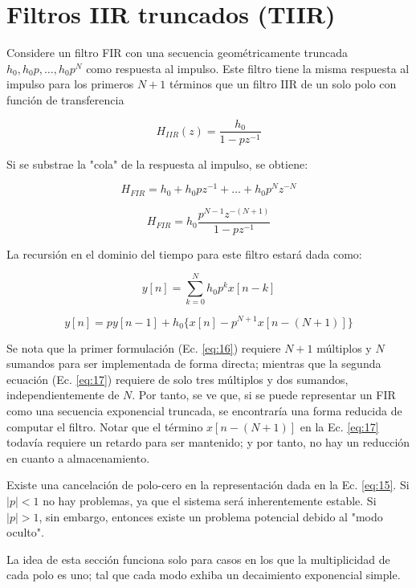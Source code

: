 \section{Filtros IIR truncados (TIIR)}
    Considere un filtro FIR con una secuencia geométricamente truncada $h_0,h_0p,\ldots , h_0 p^N$ como respuesta al impulso. Este filtro tiene la misma respuesta al impulso para los primeros $N+1$ términos que un filtro IIR de un solo polo con función de transferencia

    \begin{equation}
      H_{IIR}(z) = \frac{h_0}{1- p z^{-1}}
    \end{equation}

    Si se substrae la "cola" de la respuesta al impulso, se obtiene:

    \begin{equation}
      H_{FIR} = h_0 + h_0 p z^{-1} + \ldots + h_0 p^N z^{-N}
    \end{equation}

    \begin{equation}
      H_{FIR} = h_0 \frac{p^{N-1} z^{-(N+1)}}{1 - p z^{-1}}
      \label{eq:15}
    \end{equation}

    La recursión en el dominio del tiempo para este filtro estará dada como:

    \begin{equation}
      y[n] = \sum_{k=0}^{N}{h_0 p^k x[n-k]}
      \label{eq:16}
    \end{equation}

    \begin{equation}
      y[n] = p y[n-1] + h_0 \{x[n] - p^{N+1} x[n - (N+1)]\}
      \label{eq:17}
    \end{equation}

    Se nota que la primer formulación (Ec. \ref{eq:16}) requiere $N+1$ múltiplos y $N$ sumandos para ser implementada de forma directa; mientras que la segunda ecuación (Ec. \ref{eq:17}) requiere de solo tres múltiplos y dos sumandos, independientemente de $N$. Por tanto, se ve que, si se puede representar un FIR como una secuencia exponencial truncada, se encontraría una forma reducida de computar el filtro. Notar que el término $x[n - (N+1)]$ en la Ec. \ref{eq:17} todavía requiere un retardo para ser mantenido; y por tanto, no hay un reducción en cuanto a almacenamiento.

    Existe una cancelación de polo-cero en la representación dada en la Ec. \ref{eq:15}. Si $|p|<1$ no hay problemas, ya que el sistema será inherentemente estable. Si $|p|>1$, sin embargo, entonces existe un problema potencial debido al "modo oculto".

    La idea de esta sección funciona solo para casos en los que la multiplicidad de cada polo es uno; tal que cada modo exhiba un decaimiento exponencial simple.

    
    

